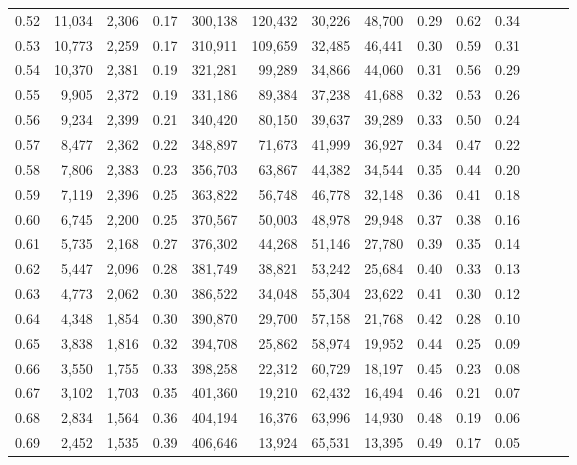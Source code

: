 \begin{tabular}{rrrrrrrrrrrrrr}
0.52 &  11,034 &  2,306 &  0.17 &  300,138 &  120,432 &  30,226 &  48,700 &  0.29 &  0.62 &      0.34 \\
0.53 &  10,773 &  2,259 &  0.17 &  310,911 &  109,659 &  32,485 &  46,441 &  0.30 &  0.59 &      0.31 \\
0.54 &  10,370 &  2,381 &  0.19 &  321,281 &   99,289 &  34,866 &  44,060 &  0.31 &  0.56 &      0.29 \\
0.55 &   9,905 &  2,372 &  0.19 &  331,186 &   89,384 &  37,238 &  41,688 &  0.32 &  0.53 &      0.26 \\
0.56 &   9,234 &  2,399 &  0.21 &  340,420 &   80,150 &  39,637 &  39,289 &  0.33 &  0.50 &      0.24 \\
0.57 &   8,477 &  2,362 &  0.22 &  348,897 &   71,673 &  41,999 &  36,927 &  0.34 &  0.47 &      0.22 \\
0.58 &   7,806 &  2,383 &  0.23 &  356,703 &   63,867 &  44,382 &  34,544 &  0.35 &  0.44 &      0.20 \\
0.59 &   7,119 &  2,396 &  0.25 &  363,822 &   56,748 &  46,778 &  32,148 &  0.36 &  0.41 &      0.18 \\
0.60 &   6,745 &  2,200 &  0.25 &  370,567 &   50,003 &  48,978 &  29,948 &  0.37 &  0.38 &      0.16 \\
0.61 &   5,735 &  2,168 &  0.27 &  376,302 &   44,268 &  51,146 &  27,780 &  0.39 &  0.35 &      0.14 \\
0.62 &   5,447 &  2,096 &  0.28 &  381,749 &   38,821 &  53,242 &  25,684 &  0.40 &  0.33 &      0.13 \\
0.63 &   4,773 &  2,062 &  0.30 &  386,522 &   34,048 &  55,304 &  23,622 &  0.41 &  0.30 &      0.12 \\
0.64 &   4,348 &  1,854 &  0.30 &  390,870 &   29,700 &  57,158 &  21,768 &  0.42 &  0.28 &      0.10 \\
0.65 &   3,838 &  1,816 &  0.32 &  394,708 &   25,862 &  58,974 &  19,952 &  0.44 &  0.25 &      0.09 \\
0.66 &   3,550 &  1,755 &  0.33 &  398,258 &   22,312 &  60,729 &  18,197 &  0.45 &  0.23 &      0.08 \\
0.67 &   3,102 &  1,703 &  0.35 &  401,360 &   19,210 &  62,432 &  16,494 &  0.46 &  0.21 &      0.07 \\
0.68 &   2,834 &  1,564 &  0.36 &  404,194 &   16,376 &  63,996 &  14,930 &  0.48 &  0.19 &      0.06 \\
0.69 &   2,452 &  1,535 &  0.39 &  406,646 &   13,924 &  65,531 &  13,395 &  0.49 &  0.17 &      0.05 \\

\end{tabular}
